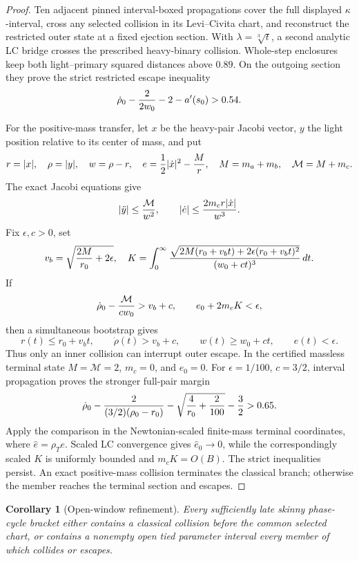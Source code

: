 \documentclass[11pt]{article}
\newtheorem{corollary}[theorem]{Corollary}
\begin{document}
\begin{proof}
Ten adjacent pinned interval-boxed propagations cover the full displayed
\(\kappa\)-interval, cross any selected collision in its Levi--Civita chart,
and reconstruct the restricted outer state at a fixed ejection section.  With
\(\lambda=\sqrt[3]t\), a second analytic LC bridge crosses the prescribed
heavy-binary collision.  Whole-step enclosures keep both light--primary
squared distances above \(0.89\).  On the outgoing section they prove the
strict restricted escape inequality
\[
 \dot\rho_0-{2\over 2w_0}-2-a'(s_0)>0.54.
\]

For the positive-mass transfer, let \(x\) be the heavy-pair Jacobi vector,
\(y\) the light position relative to its center of mass, and put
\[
 r=|x|,\quad \rho=|y|,\quad w=\rho-r,\quad
 e={1\over2}|\dot x|^2-{M\over r},\quad
 M=m_a+m_b,\quad\mathcal M=M+m_c.
\]
The exact Jacobi equations give
\[
 |\ddot y|\le{\mathcal M\over w^2},\qquad
 |\dot e|\le{2m_c r|\dot x|\over w^3}.
\]
Fix \(\epsilon,c>0\), set
\[
 v_b=\sqrt{{2M\over r_0}+2\epsilon},
\quad
 K=\int_0^\infty
 {\sqrt{2M(r_0+v_bt)+2\epsilon(r_0+v_bt)^2}
  \over(w_0+ct)^3}\,dt.
\]
If
\[
 \dot\rho_0-{\mathcal M\over cw_0}>v_b+c,\qquad
 e_0+2m_cK<\epsilon,
\]
then a simultaneous bootstrap gives
\[
 r(t)\le r_0+v_bt,\qquad
 \dot\rho(t)>v_b+c,\qquad w(t)\ge w_0+ct,\qquad e(t)<\epsilon.
\]
Thus only an inner collision can interrupt outer escape.  In the certified
massless terminal state \(M=\mathcal M=2\), \(m_c=0\), and \(e_0=0\).
For \(\epsilon=1/100\), \(c=3/2\), interval propagation proves the stronger
full-pair margin
\[
 \dot\rho_0-{2\over(3/2)(\rho_0-r_0)}
 -\sqrt{{4\over r_0}+{2\over100}}-{3\over2}>0.65.
\]
Apply the comparison in the Newtonian-scaled finite-mass terminal
coordinates, where \(\widehat e=\rho_Te\).  Scaled LC convergence gives
\(\widehat e_0\to0\), while the correspondingly scaled \(K\) is uniformly
bounded and \(m_cK=O(B)\).  The strict inequalities persist.
An exact positive-mass collision terminates the classical branch; otherwise
the member reaches the terminal section and escapes.
\end{proof}

\begin{corollary}[Open-window refinement]
Every sufficiently late skinny phase-cycle bracket either contains a
classical collision before the common selected chart, or contains a nonempty
open tied parameter interval every member of which collides or escapes.
\end{corollary}
\end{document}
